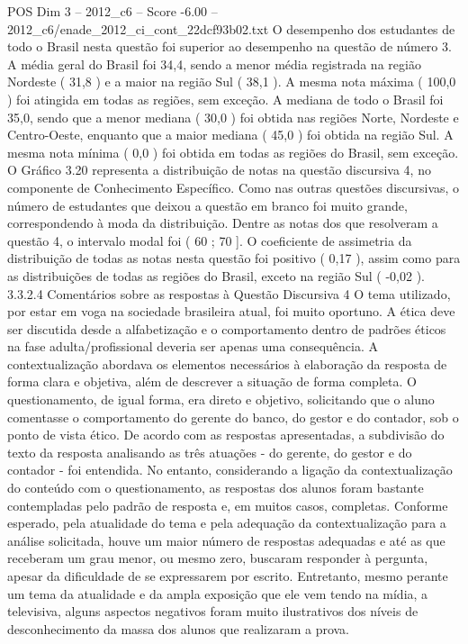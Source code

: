 \begin{textsample}{POS Dim 3 – 2012\_c6 – Score -6.00 – 2012\_c6/enade\_2012\_ci\_cont\_22dcf93b02.txt}
O desempenho dos estudantes de todo o Brasil nesta questão foi superior ao desempenho na questão de número 3.
A média geral do Brasil foi 34,4, sendo a menor média registrada na região Nordeste ( 31,8 ) e a maior na região Sul ( 38,1 ).
A mesma nota máxima ( 100,0 ) foi atingida em todas as regiões, sem exceção.
A mediana de todo o Brasil foi 35,0, sendo que a menor mediana ( 30,0 ) foi obtida nas regiões Norte, Nordeste e Centro-Oeste, enquanto que a maior mediana ( 45,0 ) foi obtida na região Sul.
A mesma nota mínima ( 0,0 ) foi obtida em todas as regiões do Brasil, sem exceção.
O Gráfico 3.20 representa a distribuição de notas na questão discursiva 4, no componente de Conhecimento Específico.
Como nas outras questões discursivas, o número de estudantes que deixou a questão em branco foi muito grande, correspondendo à moda da distribuição.
Dentre as notas dos que resolveram a questão 4, o intervalo modal foi ( 60 ; 70 ].
O coeficiente de assimetria da distribuição de todas as notas nesta questão foi positivo ( 0,17 ), assim como para as distribuições de todas as regiões do Brasil, exceto na região Sul ( -0,02 ). 3.3.2.4 Comentários sobre as respostas à Questão Discursiva 4 O tema utilizado, por estar em voga na sociedade brasileira atual, foi muito oportuno.
A ética deve ser discutida desde a alfabetização e o comportamento dentro de padrões éticos na fase adulta/profissional deveria ser apenas uma consequência.
A contextualização abordava os elementos necessários à elaboração da resposta de forma clara e objetiva, além de descrever a situação de forma completa.
O questionamento, de igual forma, era direto e objetivo, solicitando que o aluno comentasse o comportamento do gerente do banco, do gestor e do contador, sob o ponto de vista ético.
De acordo com as respostas apresentadas, a subdivisão do texto da resposta analisando as três atuações - do gerente, do gestor e do contador - foi entendida.
No entanto, considerando a ligação da contextualização do conteúdo com o questionamento, as respostas dos alunos foram bastante contempladas pelo padrão de resposta e, em muitos casos, completas.
Conforme esperado, pela atualidade do tema e pela adequação da contextualização para a análise solicitada, houve um maior número de respostas adequadas e até as que receberam um grau menor, ou mesmo zero, buscaram responder à pergunta, apesar da dificuldade de se expressarem por escrito.
Entretanto, mesmo perante um tema da atualidade e da ampla exposição que ele vem tendo na mídia, a televisiva, alguns aspectos negativos foram muito ilustrativos dos níveis de desconhecimento da massa dos alunos que realizaram a prova.

\end{textsample}
